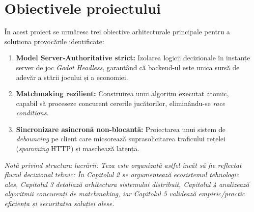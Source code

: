 \section{Obiectivele proiectului}
În acest proiect se urmăresc trei obiective arhitecturale principale pentru a soluționa provocările identificate:
\begin{enumerate}
    \item \textbf{Model Server-Authoritative strict:} Izolarea logicii decizionale în instanțe server de joc \textit{Godot Headless}, garantând că backend-ul este unica sursă de adevăr a stării jocului și a economiei.
    \item \textbf{Matchmaking rezilient:} Construirea unui algoritm executat atomic, capabil să proceseze concurent cererile jucătorilor, eliminându-se \textit{race conditions}.
    \item \textbf{Sincronizare asincronă non-blocantă:} Proiectarea unui sistem de \textit{debouncing} pe client care micșorează suprasolicitarea traficului rețelei (\textit{spamming} HTTP) și maschează latența.
\end{enumerate}

\textit{Notă privind structura lucrării: Teza este organizată astfel încât să fie reflectat fluxul decizional tehnic: În Capitolul 2 se argumentează ecosistemul tehnologic ales, Capitolul 3 detaliază arhitectura sistemului distribuit, Capitolul 4 analizează algoritmii concurenți de matchmaking, iar Capitolul 5 validează empiric/practic eficiența și securitatea soluției alese.}